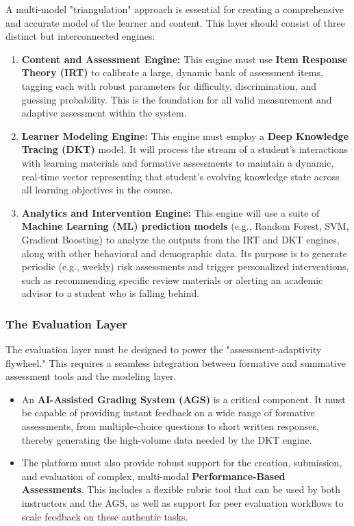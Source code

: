 \documentclass{article}
\begin{document}
A multi-model "triangulation" approach is essential for creating a comprehensive and accurate model of the learner and content. This layer should consist of three distinct but interconnected engines:
\begin{enumerate}
    \item \textbf{Content and Assessment Engine:} This engine must use \textbf{Item Response Theory (IRT)} to calibrate a large, dynamic bank of assessment items, tagging each with robust parameters for difficulty, discrimination, and guessing probability. This is the foundation for all valid measurement and adaptive assessment within the system.\cite{69, 75}
    \item \textbf{Learner Modeling Engine:} This engine must employ a \textbf{Deep Knowledge Tracing (DKT)} model. It will process the stream of a student's interactions with learning materials and formative assessments to maintain a dynamic, real-time vector representing that student's evolving knowledge state across all learning objectives in the course.\cite{80, 83}
    \item \textbf{Analytics and Intervention Engine:} This engine will use a suite of \textbf{Machine Learning (ML) prediction models} (e.g., Random Forest, SVM, Gradient Boosting) to analyze the outputs from the IRT and DKT engines, along with other behavioral and demographic data. Its purpose is to generate periodic (e.g., weekly) risk assessments and trigger personalized interventions, such as recommending specific review materials or alerting an academic advisor to a student who is falling behind.\cite{84, 87, 88}
\end{enumerate}

\subsubsection{The Evaluation Layer}

The evaluation layer must be designed to power the "assessment-adaptivity flywheel." This requires a seamless integration between formative and summative assessment tools and the modeling layer.
\begin{itemize}
    \item An \textbf{AI-Assisted Grading System (AGS)} is a critical component. It must be capable of providing instant feedback on a wide range of formative assessments, from multiple-choice questions to short written responses, thereby generating the high-volume data needed by the DKT engine.\cite{103, 107}
    \item The platform must also provide robust support for the creation, submission, and evaluation of complex, multi-modal \textbf{Performance-Based Assessments}. This includes a flexible rubric tool that can be used by both instructors and the AGS, as well as support for peer evaluation workflows to scale feedback on these authentic tasks.\cite{65, 96, 100}
\end{itemize}
\end{document}

